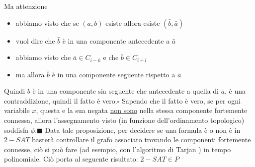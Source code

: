 \documentclass[10pt, letterpaper]{report}
\begin{document}
Ma attenzione \begin{itemize}
    \item abbiamo visto che se $(a,b)$ esiste allora esiste $(\bar b,\bar a)$
    \item vuol dire che $\bar b$ è in una componente antecedente a $\bar a$
    \item abbiamo visto che $\bar a \in C_{i-k}$ e che $\bar b \in C_{i+l}$
    \item ma allora $\bar b$ è in una componente seguente rispetto a $\bar a$
\end{itemize}
Quindi $\bar b$ è in una componente sia seguente che antecedente a quella di $\bar a$, è una contraddizione, quindi il fatto è vero.\hfill$\square$\acc 
Sapendo che il fatto è vero, se per ogni variabile $x$, questa e la sua negata \underline{non sono} nella stessa componente fortemente connessa, allora l'assegnamento visto (in funzione dell'ordinamento topologico) soddisfa $\phi$.\hfill$\blacksquare$\acc 
Data tale proposizione, per decidere se una formula è o non è in $2-SAT$ basterà controllare il grafo associato trovando le componenti fortemente connesse, ciò si può fare (ad esempio, con l'algoritmo di Tarjan ) in tempo polinomiale. Ciò porta al seguente risultato:\acc
\teo{} $2-SAT\in P $
\flowerLine 
\end{document}
